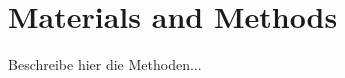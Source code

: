 \tikzset{external/prefix=tikz/Materials/}
\chapter{Materials and Methods}
Beschreibe hier die Methoden...